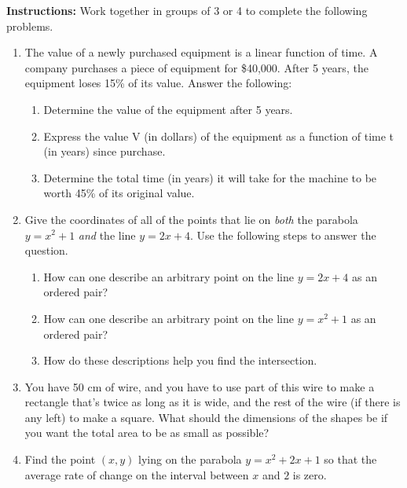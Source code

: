 

\noindent \textbf{Instructions:}  Work together in groups of  3 or 4 to complete the following problems.


\begin{enumerate}



\item The value of a newly purchased equipment is a linear function of time. A company purchases a piece of equipment for \$40,000. After 5 years, the equipment loses 15\% of its value. Answer the following:

\begin{enumerate}
\item Determine the value of the equipment after 5 years.
\item Express the value V (in dollars) of the equipment as a function of time t (in years) since purchase.
\item Determine the total time (in years) it will take for the machine to be worth 45\% of its original value.
\end{enumerate}

\vfill

\item Give the coordinates of all of the points that lie on \emph{both} the parabola $y=x^2+1$ \emph{and} the line $y=2x+4$.  Use the following steps to answer the question.
	\begin{enumerate}
		\item How can one describe an arbitrary point on the line $y=2x+4$ as an ordered pair?
		\item How can one describe an arbitrary point on the line $y=x^2+1$ as an ordered pair?
		\item How do these descriptions help you find the intersection.
	\end{enumerate}

\vfill
\newpage


\item You have 50 cm of wire, and you have to use part of this wire to
make a rectangle that's twice as long as it is wide, and the rest of the wire (if there
is any left) to make a square.
What should the dimensions of the shapes be if you want the total area to be as
small as possible? 

\newpage

\item Find the point $(x,y)$ lying on the parabola $y = x^2 + 2x + 1$ so that the average rate of change on the interval between $x$ and $2$ is zero.


\end{enumerate}
